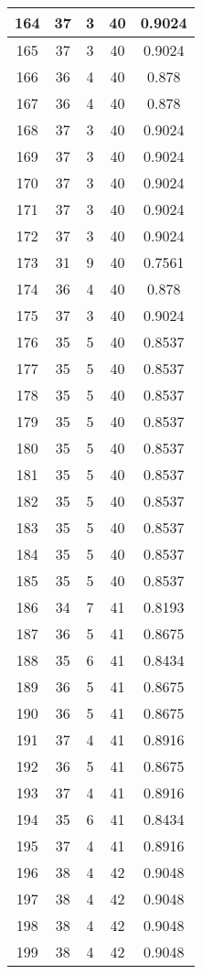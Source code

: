 \documentclass[letterpaper, 12pt]{article}
\begin{document}
\begin{longtable}{|c|c|c|c|c|}
\hline
164 & 37 & 3 & 40 & 0.9024 \\
\hline
165 & 37 & 3 & 40 & 0.9024 \\
\hline
166 & 36 & 4 & 40 & 0.878 \\
\hline
167 & 36 & 4 & 40 & 0.878 \\
\hline
168 & 37 & 3 & 40 & 0.9024 \\
\hline
169 & 37 & 3 & 40 & 0.9024 \\
\hline
170 & 37 & 3 & 40 & 0.9024 \\
\hline
171 & 37 & 3 & 40 & 0.9024 \\
\hline
172 & 37 & 3 & 40 & 0.9024 \\
\hline
173 & 31 & 9 & 40 & 0.7561 \\
\hline
174 & 36 & 4 & 40 & 0.878 \\
\hline
175 & 37 & 3 & 40 & 0.9024 \\
\hline
176 & 35 & 5 & 40 & 0.8537 \\
\hline
177 & 35 & 5 & 40 & 0.8537 \\
\hline
178 & 35 & 5 & 40 & 0.8537 \\
\hline
179 & 35 & 5 & 40 & 0.8537 \\
\hline
180 & 35 & 5 & 40 & 0.8537 \\
\hline
181 & 35 & 5 & 40 & 0.8537 \\
\hline
182 & 35 & 5 & 40 & 0.8537 \\
\hline
183 & 35 & 5 & 40 & 0.8537 \\
\hline
184 & 35 & 5 & 40 & 0.8537 \\
\hline
185 & 35 & 5 & 40 & 0.8537 \\
\hline
186 & 34 & 7 & 41 & 0.8193 \\
\hline
187 & 36 & 5 & 41 & 0.8675 \\
\hline
188 & 35 & 6 & 41 & 0.8434 \\
\hline
189 & 36 & 5 & 41 & 0.8675 \\
\hline
190 & 36 & 5 & 41 & 0.8675 \\
\hline
191 & 37 & 4 & 41 & 0.8916 \\
\hline
192 & 36 & 5 & 41 & 0.8675 \\
\hline
193 & 37 & 4 & 41 & 0.8916 \\
\hline
194 & 35 & 6 & 41 & 0.8434 \\
\hline
195 & 37 & 4 & 41 & 0.8916 \\
\hline
196 & 38 & 4 & 42 & 0.9048 \\
\hline
197 & 38 & 4 & 42 & 0.9048 \\
\hline
198 & 38 & 4 & 42 & 0.9048 \\
\hline
199 & 38 & 4 & 42 & 0.9048 \\
\hline
\end{longtable}
\end{document}
